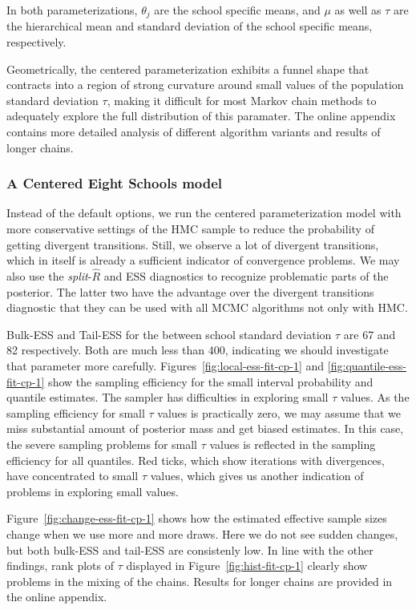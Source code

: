 \documentclass[american,]{article}
\begin{document}
In both parameterizations, $\theta_j$ are the school specific means,
and $\mu$ as well as $\tau$ are the hierarchical mean and standard deviation 
of the school specific means, respectively.

Geometrically, the centered parameterization exhibits a funnel shape
that contracts into a region of strong curvature around small
values of the population standard deviation $\tau$, making it difficult for most
Markov chain methods to adequately explore the full distribution of this
paramater. The online appendix contains more detailed analysis of different 
algorithm variants and results of longer chains.

\hypertarget{a-centered-eight-schools-model}{%
\subsubsection{A Centered Eight Schools
model}\label{a-centered-eight-schools-model}}

Instead of the default options, we run the centered parameterization
model with more conservative settings of the HMC sample to reduce the
probability of getting divergent transitions. Still, we observe a lot of divergent
transitions, which in itself is already a sufficient indicator of
convergence problems. We may also use the \emph{split}-\(\widehat{R}\) and ESS
diagnostics to recognize problematic parts of the posterior. The latter
two have the advantage over the divergent transitions diagnostic that they
can be used with all MCMC algorithms not only with HMC.

Bulk-ESS and Tail-ESS for the between school standard deviation $\tau$
are 67 and 82 respectively. Both are much less than 400, indicating we
should investigate that parameter more carefully.
Figures~\ref{fig:local-ess-fit-cp-1} and
\ref{fig:quantile-ess-fit-cp-1} show the sampling efficiency for the
small interval probability and quantile estimates.
The sampler has difficulties in exploring small $\tau$ values. As the
sampling efficiency for small $\tau$ values is practically zero, we
may assume that we miss substantial amount of posterior mass and
get biased estimates. In this case, the severe sampling problems for
small $\tau$ values is reflected in the sampling efficiency for all
quantiles. Red ticks, which show iterations with divergences, have
concentrated to small $\tau$ values, which gives us another indication
of problems in exploring small values.

Figure~\ref{fig:change-ess-fit-cp-1} shows how the estimated effective
sample sizes change when we use more and more draws. Here we do not
see sudden changes, but both bulk-ESS and tail-ESS are consistenly low. 
In line with the other findings, rank plots of $\tau$ displayed in
Figure~\ref{fig:hist-fit-cp-1} clearly show problems in the mixing of
the chains. Results for longer chains are provided in the online appendix.
\end{document}

